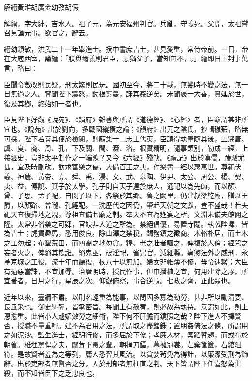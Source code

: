 
\begin{pinyinscope}
解縉黃淮胡廣金幼孜胡儼

解縉，字大紳，吉水人。祖子元，為元安福州判官。兵亂，守義死。父開，太祖嘗召見論元事。欲官之，辭去。

縉幼穎敏，洪武二十一年舉進士。授中書庶吉士，甚見愛重，常侍帝前。一日，帝在大庖西室，諭縉：「朕與爾義則君臣，恩猶父子，當知無不言。」縉即日上封事萬言，略曰：

臣聞令數改則民疑，刑太繁則民玩。國初至今，將二十載，無幾時不變之法，無一日無過之人。嘗聞陛下震怒，鋤根剪蔓，誅其姦逆矣。未聞褒一大善，賞延於世，復及其鄉，終始如一者也。

臣見陛下好觀《說苑》、《韻府》雜書與所謂《道德經》、《心經》者，臣竊謂甚非所宜也。《說苑》出於劉向，多戰國縱橫之論；《韻府》出元之陰氏，抄輯穢蕪，略無可採。陛下若喜其便於檢閱，則願集一二志士儒英，臣請得執筆隨其後，上溯唐、虞、夏、商、周、孔，下及關、閩、濂、洛。根實精明，隨事類別，勒成一經，上接經史，豈非太平制作之一端歟？又今《六經》殘缺。《禮記》出於漢儒，踳駁尤甚，宜及時刪改。訪求審樂之儒，大備百王之典，作樂書一經以惠萬世。尊祀伏羲、神農、黃帝、堯、舜、禹、湯、文、武、皋陶、伊尹、太公、周公、稷、契、夷、益、傅說、箕子於太學。孔子則自天子達於庶人，通祀以為先師，而以顏、曾、子思、孟子配。自閔子以下，各祭於其鄉。魯之闕里，仍建叔梁紇廟，贈以王爵，以顏路、曾曨、孔鯉配。一洗歷代之因仍，肇起天朝之文獻，豈不盛哉！若夫祀天宜復掃地之規，尊祖宜備七廟之制。奉天不宜為筵宴之所，文淵未備夫館閣之隆。太常非俗樂之可肄，官妓非人道之所為。禁絕倡優，易置寺閹。執戟陛墀，皆為吉士；虎賁趣馬，悉用俊良。除山澤之禁稅，蠲務鎮之徵商。木輅朴居，而土木之工勿起；布墾荒田，而四裔之地勿貪。釋、老之壯者驅之，俾復於人倫；經咒之妄者火之，俾絕其欺誑。絕鬼巫，破淫祀，省冗官，減細縣。痛懲法外之威刑，永革京城之工役。流十年而聽復，杖八十以無加。婦女非帷薄不修，毋令逮繫；大臣有過惡當誅，不宜加辱。治曆明時，授民作事，但申播植之宜，何用建除之謬。所宜著者，日月之行，星辰之次。仰觀俯察，事合逆順。七政之齊，正此類也。

近年以來，臺綱不肅。以刑名輕重為能事，以問囚多寡為勳勞，甚非所以勵清要、長風采也。御史糾彈，皆承密旨。每聞上有赦宥，則必故為執持。意謂如此，則上恩愈重。此皆小人趨媚效勞之細術，陛下何不肝膽而鏡照之哉？陛下進人不擇賢否，授職不量重輕。建不為君用之法，所謂取之盡錙銖；置朋姦倚法之條，所謂用之如泥沙。監生進士，經明行修，而多屈於下僚；孝廉人材，冥蹈瞽趨，而或布於朝省。椎埋嚚悍之夫，闒茸下愚之輩。朝捐刀鑷，暮擁冠裳。左棄筐篋，右綰組符。是故賢者羞為之等列，庸人悉習其風流。以貪婪茍免為得計，以廉潔受刑為飾辭。出於吏部者無賢否之分，入於刑部者無枉直之判。天下皆謂陛下任喜怒為生殺，而不知皆臣下之乏忠良也。


\end{pinyinscope}
